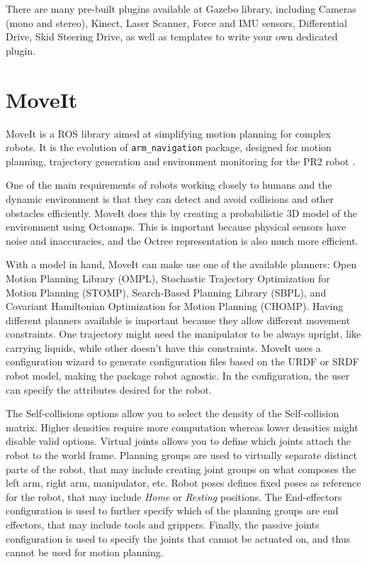 There are many pre-built plugins available at Gazebo library, including Cameras (mono and stereo), Kinect, Laser Scanner, Force and IMU sensors, Differential Drive, Skid Steering Drive, as well as templates to write your own dedicated plugin.


\section{MoveIt}

MoveIt is a ROS library aimed at simplifying motion planning for complex robots. It is the evolution of \texttt{arm\_navigation} package, designed for motion planning, trajectory generation and environment monitoring for the PR2 robot \cite{chitta2012moveit}.

One of the main requirements of robots working closely to humans and the dynamic environment is that they can detect and avoid collisions and other obstacles efficiently. MoveIt does this by creating a probabilistic 3D model of the environment using Octomaps. This is important because physical sensors have noise and inaccuracies, and the Octree representation is also much more efficient.

With a model in hand, MoveIt can make use one of the available planners: Open Motion Planning Library (OMPL), Stochastic Trajectory Optimization for Motion Planning (STOMP), Search-Based Planning Library (SBPL), and Covariant Hamiltonian Optimization for Motion Planning (CHOMP). Having different planners available is important because they allow different movement constraints. One trajectory might need the manipulator to be always upright, like carrying liquids, while other doesn't have this constraints. MoveIt uses a configuration wizard to generate configuration files based on the URDF or SRDF robot model, making the package robot agnostic. In the configuration, the user can specify the attributes desired for the robot.

The Self-collisions options allow you to select the density of the Self-collision matrix. Higher densities require more computation whereas lower densities might disable valid options. Virtual joints allows you to define which joints attach the robot to the world frame. Planning groups are used to virtually separate distinct parts of the robot, that may include creating joint groups on what composes the left arm, right arm, manipulator, etc. Robot poses defines fixed poses as reference for the robot, that may include \textit{Home} or \textit{Resting} positions. The End-effectors configuration is used to further specify which of the planning groups are end effectors, that may include tools and grippers. Finally, the passive joints configuration is used to specify the joints that cannot be actuated on, and thus cannot be used for motion planning.

